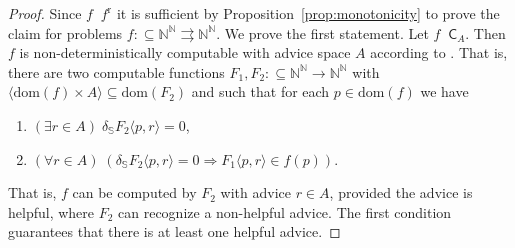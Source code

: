 \documentclass[11pt,a4paper]{amsart}
\theoremstyle{plain}
\theoremstyle{definition}
\theoremstyle{defC}
\theoremstyle{thmC}
\theoremstyle{plain}
\numberwithin{equation}{section}
\def\r{\mathrm{r}}
\def\IN{{\mathbb{N}}}
\def\IS{{\mathbb{S}}}
\def\TO{\Longrightarrow}
\def\In{\subseteq}
\def\mto{\rightrightarrows}
\def\C{{\mathsf{{C}}}}
\def\C{\mathsf{C}}
\def\r{\mathrm{r}}
\def\leqW{\mathop{\leq_{\mathrm{W}}}}
\def\equivSW{\mathop{\equiv_{\mathrm{sW}}}}
\def\leqW{\mathop{\leq_{\mathrm{W}}}}
\def\equivSW{\mathop{\equiv_{\mathrm{sW}}}}
\def\dom{{\mathrm{dom}}}
\begin{document}
\begin{proof}
Since $f\equivSW f^\r$ it is sufficient by Proposition~\ref{prop:monotonicity} to prove the claim for problems $f:\In\IN^\IN\mto\IN^\IN$. We prove the first statement.
Let $f\leqW\C_A$. Then $f$ is non-deterministically computable with advice space $A$
according to \cite[Definition~7.1, Theorem~7.2]{BBP12}.  That is, there are two computable functions $F_1,F_2:\In\IN^\IN\to\IN^\IN$
with $\langle\dom(f)\times A\rangle\In\dom(F_2)$ and such that for each $p\in\dom(f)$ we have
\begin{enumerate}
\item $(\exists r\in A)\;\delta_\IS F_2\langle p,r\rangle=0$,
\item $(\forall r\in A)\;(\delta_\IS F_2\langle p,r\rangle=0\TO F_1\langle p,r\rangle\in f(p))$.
\end{enumerate}
That is, $f$ can be computed by $F_2$ with advice $r\in A$, provided the advice is helpful, where
$F_2$ can recognize a non-helpful advice.
The first condition guarantees that there is at least one helpful advice.


\end{proof}
\end{document}

